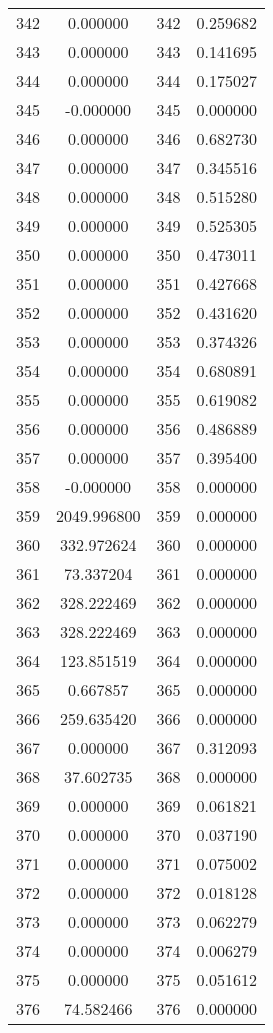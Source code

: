 \documentclass[12pt]{article}
\begin{document}
\begin{longtable}{@{}cccc@{}}
342 & 0.000000 & 342 & 0.259682 \\
343 & 0.000000 & 343 & 0.141695 \\
344 & 0.000000 & 344 & 0.175027 \\
345 & -0.000000 & 345 & 0.000000 \\
346 & 0.000000 & 346 & 0.682730 \\
347 & 0.000000 & 347 & 0.345516 \\
348 & 0.000000 & 348 & 0.515280 \\
349 & 0.000000 & 349 & 0.525305 \\
350 & 0.000000 & 350 & 0.473011 \\
351 & 0.000000 & 351 & 0.427668 \\
352 & 0.000000 & 352 & 0.431620 \\
353 & 0.000000 & 353 & 0.374326 \\
354 & 0.000000 & 354 & 0.680891 \\
355 & 0.000000 & 355 & 0.619082 \\
356 & 0.000000 & 356 & 0.486889 \\
357 & 0.000000 & 357 & 0.395400 \\
358 & -0.000000 & 358 & 0.000000 \\
359 & 2049.996800 & 359 & 0.000000 \\
360 & 332.972624 & 360 & 0.000000 \\
361 & 73.337204 & 361 & 0.000000 \\
362 & 328.222469 & 362 & 0.000000 \\
363 & 328.222469 & 363 & 0.000000 \\
364 & 123.851519 & 364 & 0.000000 \\
365 & 0.667857 & 365 & 0.000000 \\
366 & 259.635420 & 366 & 0.000000 \\
367 & 0.000000 & 367 & 0.312093 \\
368 & 37.602735 & 368 & 0.000000 \\
369 & 0.000000 & 369 & 0.061821 \\
370 & 0.000000 & 370 & 0.037190 \\
371 & 0.000000 & 371 & 0.075002 \\
372 & 0.000000 & 372 & 0.018128 \\
373 & 0.000000 & 373 & 0.062279 \\
374 & 0.000000 & 374 & 0.006279 \\
375 & 0.000000 & 375 & 0.051612 \\
376 & 74.582466 & 376 & 0.000000 \\

\end{longtable}
\end{document}
